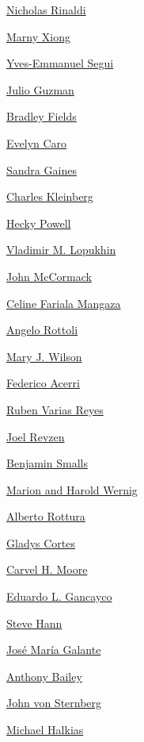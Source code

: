 \protect\hyperlink{nicholas-rinaldi}{Nicholas Rinaldi}

\protect\hyperlink{marny-xiong}{Marny Xiong}

\protect\hyperlink{-yvesemmanuel-segui}{Yves-Emmanuel Segui}

\protect\hyperlink{julio-guzman}{Julio Guzman}

\protect\hyperlink{bradley-fields}{Bradley Fields}

\protect\hyperlink{evelyn-caro}{Evelyn Caro}

\protect\hyperlink{sandra-gaines}{Sandra Gaines}

\protect\hyperlink{charles-kleinberg}{Charles Kleinberg}

\protect\hyperlink{hecky-powell}{Hecky Powell}

\protect\hyperlink{vladimir-m-lopukhin}{Vladimir M. Lopukhin}

\protect\hyperlink{john-mccormack}{John McCormack}

\protect\hyperlink{celine-fariala-mangaza}{Celine Fariala Mangaza}

\protect\hyperlink{angelo-rottoli}{Angelo Rottoli}

\protect\hyperlink{mary-j-wilson}{Mary J. Wilson}

\protect\hyperlink{federico-acerri}{Federico Acerri}

\protect\hyperlink{ruben-varias-reyes}{Ruben Varias Reyes}

\protect\hyperlink{joel-revzen}{Joel Revzen}

\protect\hyperlink{benjamin-smalls}{Benjamin Smalls}

\protect\hyperlink{marion-and-harold-wernig}{Marion and Harold Wernig}

\protect\hyperlink{alberto-rottura}{Alberto Rottura}

\protect\hyperlink{gladys-cortes}{Gladys Cortes}

\protect\hyperlink{carvel-h-moore}{Carvel H. Moore}

\protect\hyperlink{eduardo-l-gancayco}{Eduardo L. Gancayco}

\protect\hyperlink{steve-hann}{Steve Hann}

\protect\hyperlink{josuxe9-maruxeda-galante}{José María Galante}

\protect\hyperlink{anthony-bailey}{Anthony Bailey}

\protect\hyperlink{john-von-sternberg}{John von Sternberg}

\protect\hyperlink{michael-halkias}{Michael Halkias}


